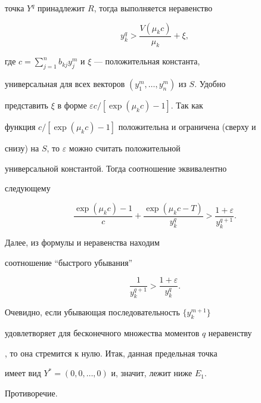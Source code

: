 \begin{pf}
точка $Y^q$ принадлежит $R$, тогда выполняется неравенство


\begin{equation}


y_k^q>\frac{V(\mu_k c)}{\mu_k}+\xi,


\label{2.7}


\end{equation}


где $c=\sum\limits_{j=1}^n b_{kj}y_j^m$ и $\xi$ --- положительная константа, 


универсальная для всех векторов $(y^m_1,\dotsc,y_n^m)$ из $S$. Удобно 


представить $\xi$ в форме $\varepsilon c/[\exp(\mu_kc)-1]$. Так как 


функция $c/[\exp(\mu_kc)-1]$ положительна и ограничена (сверху и 


снизу) на $S$, то $\varepsilon$ можно считать положительной 


универсальной константой. Тогда соотношение  эквивалентно 


следующему


\begin{equation}


\frac{\exp(\mu_kc)-1}{c}+\frac{\exp(\mu_kc-T)}{y_k^q}>


\frac{1+\varepsilon}{y_k^{q+1}}.


\label{2.8}


\end{equation}


Далее, из формулы  и неравенства  находим 


соотношение ``быстрого убывания''


\begin{equation}


\frac{1}{y_k^{q+1}}>\frac{1+\varepsilon}{y_k^q}.


\label{2.9}


\end{equation}


Очевидно, если убывающая последовательность $\{y_k^{m+1}\}$ 


удовлетворяет для бесконечного множества моментов $q$ неравенству 


, то она стремится к нулю. Итак, данная предельная точка 


имеет вид $Y^*=(0,0,\dotsc,0)$ и, значит, лежит ниже $E_1$. 


Противоречие.


\medskip






\end{pf}
